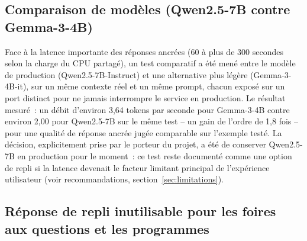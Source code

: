\subsection{Comparaison de modèles (Qwen2.5-7B contre Gemma-3-4B)}

Face à la latence importante des réponses ancrées (60 à plus de 300 secondes selon la charge du CPU partagé), un test comparatif a été mené entre le modèle de production (Qwen2.5-7B-Instruct) et une alternative plus légère (Gemma-3-4B-it), sur un même contexte réel et un même prompt, chacun exposé sur un port distinct pour ne jamais interrompre le service en production. Le résultat mesuré~: un débit d'environ 3,64 tokens par seconde pour Gemma-3-4B contre environ 2,00 pour Qwen2.5-7B sur le même test -- un gain de l'ordre de 1,8 fois -- pour une qualité de réponse ancrée jugée comparable sur l'exemple testé. La décision, explicitement prise par le porteur du projet, a été de conserver Qwen2.5-7B en production pour le moment~: ce test reste documenté comme une option de repli si la latence devenait le facteur limitant principal de l'expérience utilisateur (voir recommandations, section~\ref{sec:limitations}).

\subsection{Réponse de repli inutilisable pour les foires aux questions et les programmes}

